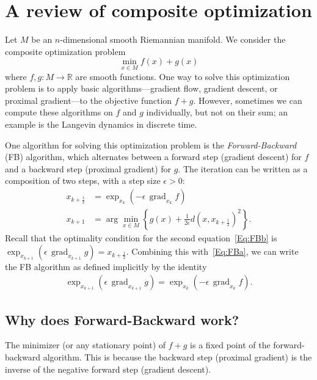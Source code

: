\documentclass[final,12pt]{colt2018}
\newcommand{\R}{\mathbb{R}}
\DeclareMathOperator{\grad}{grad}
\newcommand{\M}{{M}}
\begin{document}
\section{A review of composite optimization}
\label{App:Comp}

Let $\M$ be an $n$-dimensional smooth Riemannian manifold.
We consider the composite optimization problem
$$\min_{x \in \M} f(x) + g(x)$$
where $f,g \colon \M \to \R$ are smooth functions.
One way to solve this optimization problem is to apply basic algorithms---gradient flow, gradient descent, or proximal gradient---to the objective function $f + g$.
However, sometimes we can compute these algorithms on $f$ and $g$ individually, but not on their sum; an example is the Langevin dynamics in discrete time.

One algorithm for solving this optimization problem is the {\em Forward-Backward} (FB) algorithm, which alternates between a forward step (gradient descent) for $f$ and a backward step (proximal gradient) for $g$.
The iteration can be written as a composition of two steps, with a step size $\epsilon > 0$:
\begin{subequations}\label{Eq:FB}
\begin{align}
x_{k+\frac{1}{2}} &= \exp_{x_k}(-\epsilon \, \grad_{x_k} f) \label{Eq:FBa} \\ 
x_{k+1} &= \arg\min_{x\in\M} \left\{ g(x) + \frac{1}{2\epsilon} d(x,x_{k+\frac{1}{2}})^2\right\}. \label{Eq:FBb}
\end{align}
\end{subequations}
Recall that the optimality condition for the second equation~\eqref{Eq:FBb} is
$\exp_{x_{k+1}}(\epsilon \, \grad_{x_{k+1}} g ) = x_{k+\frac{1}{2}}.$
Combining this with~\eqref{Eq:FBa}, we can write the FB algorithm as defined implicitly by the identity
\begin{align}\label{Eq:FBid}
\exp_{x_{k+1}}(\epsilon \, \grad_{x_{k+1}} g ) = \exp_{x_k}(-\epsilon \, \grad_{x_k} f).
\end{align}


\subsection{Why does Forward-Backward work?}
\label{App:WhyFB}

The minimizer (or any stationary point) of $f+g$ is a fixed point of the forward-backward algorithm.
This is because the backward step (proximal gradient) is the inverse of the negative forward step (gradient descent).
\end{document}
